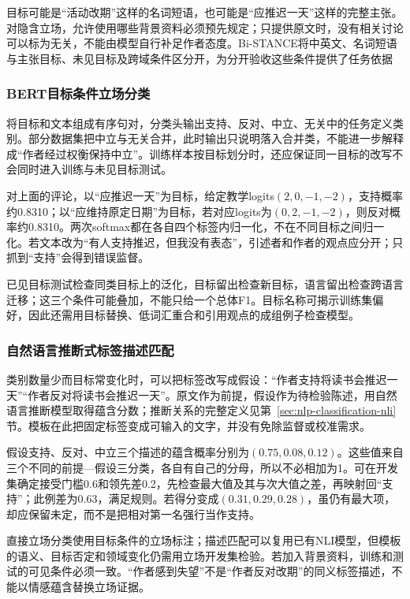 目标可能是“活动改期”这样的名词短语，也可能是“应推迟一天”这样的完整主张。对隐含立场，允许使用哪些背景资料必须预先规定；只提供原文时，没有相关讨论可以标为无关，不能由模型自行补足作者态度。Bi-STANCE将中英文、名词短语与主张目标、未见目标及跨域条件区分开，为分开验收这些条件提供了任务依据

\subsubsection{BERT目标条件立场分类}
\label{sec:nlp-classification-stance-bert}

将目标和文本组成有序句对，分类头输出支持、反对、中立、无关中的任务定义类别。部分数据集把中立与无关合并，此时输出只说明落入合并类，不能进一步解释成“作者经过权衡保持中立”。训练样本按目标划分时，还应保证同一目标的改写不会同时进入训练与未见目标测试。

对上面的评论，以“应推迟一天”为目标，给定教学logits$(2,0,-1,-2)$，支持概率约0.8310；以“应维持原定日期”为目标，若对应logits为$(0,2,-1,-2)$，则反对概率约0.8310。两次softmax都在各自四个标签内归一化，不在不同目标之间归一化。若文本改为“有人支持推迟，但我没有表态”，引述者和作者的观点应分开；只抓到“支持”会得到错误监督。

已见目标测试检查同类目标上的泛化，目标留出检查新目标，语言留出检查跨语言迁移；这三个条件可能叠加，不能只给一个总体F1。目标名称可揭示训练集偏好，因此还需用目标替换、低词汇重合和引用观点的成组例子检查模型。

\subsubsection{自然语言推断式标签描述匹配}
\label{sec:nlp-classification-stance-nli}

类别数量少而目标常变化时，可以把标签改写成假设：“作者支持将读书会推迟一天”“作者反对将读书会推迟一天”。原文作为前提，假设作为待检验陈述，用自然语言推断模型取得蕴含分数；推断关系的完整定义见第~\ref{sec:nlp-classification-nli}节。模板在此把固定标签变成可输入的文字，并没有免除监督或校准需求。

假设支持、反对、中立三个描述的蕴含概率分别为$(0.75,0.08,0.12)$。这些值来自三个不同的前提—假设三分类，各自有自己的分母，所以不必相加为1。可在开发集确定接受门槛0.6和领先差0.2，先检查最大值及其与次大值之差，再映射回“支持”；此例差为0.63，满足规则。若得分变成$(0.31,0.29,0.28)$，虽仍有最大项，却应保留未定，而不是把相对第一名强行当作支持。

直接立场分类使用目标条件的立场标注；描述匹配可以复用已有NLI模型，但模板的语义、目标否定和领域变化仍需用立场开发集检验。若加入背景资料，训练和测试的可见条件必须一致。“作者感到失望”不是“作者反对改期”的同义标签描述，不能以情感蕴含替换立场证据。

